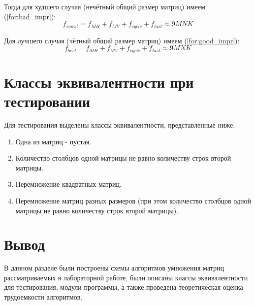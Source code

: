 Тогда для худшего случая (нечётный общий размер матриц) имеем (\ref{for:bad_impr}):
\begin{equation}
	\label{for:bad_impr}
	f_{worst} = f_{MH} + f_{MV} + f_{cycle} + f_{last} \approx 9MNK
\end{equation}

Для лучшего случая (чётный общий размер матриц) имеем (\ref{for:good_impr}):
\begin{equation}
	\label{for:good_impr}
	f_{best} = f_{MH} + f_{MV} + f_{cycle} + f_{last} \approx 9MNK
\end{equation}


\section{Классы эквивалентности при тестировании}

Для тестирования выделены классы эквивалентности, представленные ниже.

\begin{enumerate}
	\item Одна из матриц - пустая.
	\item Количество столбцов одной матрицы не равно количеству строк второй матрицы.
	\item Перемножение квадратных матриц.
	\item Перемножение матриц разных размеров (при этом количество столбцов одной матрицы не равно количеству строк второй матрицы).
\end{enumerate}


\section{Вывод}

В данном разделе были построены схемы алгоритмов умножения матриц рассматриваемых в лабораторной работе, были описаны классы эквивалентности для тестирования, модули программы, а также проведена теоретическая оценка трудоемкости алгоритмов.
